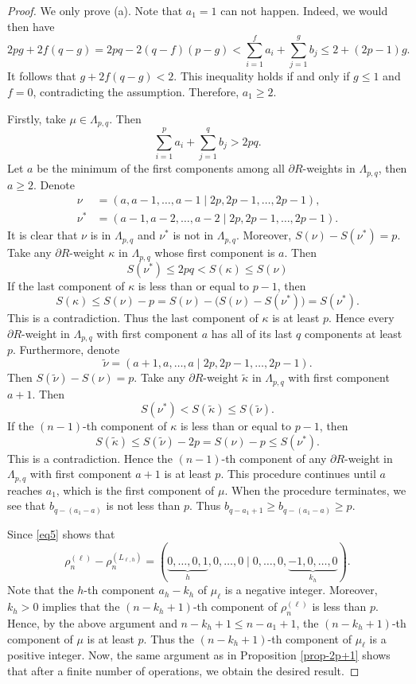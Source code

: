 \documentclass[10pt,a4paper]{amsart}
\begin{document}
\begin{proof}
	We  only prove (a).  Note that $a_1=1$ can not happen. Indeed, we would then have
	\[2pg+2f(q-g)=2pq-2(q-f)(p-g)<\sum_{i=1}^f a_i+\sum_{j=1}^g b_j\le 2+(2p-1)g.\]
  It follows that $g+2f(q-g)<2$. This inequality holds if and only if $g\le 1$ and $f=0$, contradicting the assumption. Therefore, $a_1\ge 2$.


Firstly, take $\mu\in\Lambda_{p, q}$. Then
	\[\sum_{i=1}^pa_i+\sum_{j=1}^qb_j>2pq.\]
	Let $a$ be the minimum of the first components among all $\partial R$-weights in $\Lambda_{p,q}$, then $a\ge 2$. Denote
	\begin{align*}
		\nu&=(a,a-1,\dots,a-1\mid 2p,2p-1,\dots,2p-1), \\
		\nu^*&=(a-1,a-2,\dots,a-2\mid 2p,2p-1,\dots,2p-1).
	\end{align*}
	It is clear that $\nu$ is in $\Lambda_{p,q}$ and $\nu^*$ is not in $\Lambda_{p,q}$. Moreover, $S(\nu)-S(\nu^*)=p$.
Take any $\partial R$-weight $\kappa$ in $\Lambda_{p,q}$ whose first component is $a$. Then
$$
S(\nu^*)\le 2pq< S(\kappa)\leq S(\nu)
$$
If the last component of $\kappa$ is less than or equal to $p-1$, then
$$
S(\kappa)\leq S(\nu)-p=S(\nu)-\big(S(\nu)-S(\nu^*)\big)=S(\nu^*).
$$
This is a contradiction. Thus the last component of $\kappa$ is at least $p$. Hence every $\partial R$-weight in $\Lambda_{p,q}$ with first component $a$ has all of its last $q$ components at least $p$. Furthermore, denote
	\[\widetilde{\nu}=(a+1,a,\dots,a\mid 2p,2p-1,\dots,2p-1).\]
	Then $S(\widetilde{\nu})-S(\nu)=p$.
Take any $\partial R$-weight $\widetilde{\kappa}$ in $\Lambda_{p,q}$ with first component $a+1$. Then
$$
S(\nu^*)<S(\widetilde{\kappa})\leq S(\widetilde{\nu}).
 $$
If the $(n-1)$-th component of $\kappa$ is less than or equal to $p-1$, then
$$
S(\widetilde{\kappa})\leq S(\widetilde{\nu})-2p=S(\nu)-p\leq S(\nu^*).
$$
This is a contradiction. Hence the $(n-1)$-th component of any $\partial R$-weight in $\Lambda_{p,q}$ with first component $a+1$ is at least $p$. This procedure continues until $a$ reaches $a_1$,  which is the first component of $\mu$. When the procedure terminates, we see that $b_{q-(a_1-a)}$ is not less than $p$. Thus $b_{q-a_1+1}\ge b_{q-(a_1-a)}\ge p$.
	
	Since \eqref{eq5} shows that
	\[\rho_n^{(\ell)}-\rho_n^{(L_{\ell, h})}=(\underbrace{0,\dots,0,1}_{h},0,\dots,0\mid 0,\dots,0,\underbrace{-1,0,\dots,0}_{k_{h}}).\]
	Note that the $h$-th component $a_h-k_h$ of $\mu_\ell$ is a negative integer. Moreover, $k_h>0$ implies that the $(n-k_h+1)$-th component of $\rho_n^{(\ell)}$ is less than $p$. Hence, by the above argument and $n-k_h+1\le n-a_1+1$, the $(n-k_h+1)$-th component of $\mu$ is at least $p$. Thus the $(n-k_h+1)$-th component of $\mu_\ell$ is a positive integer. Now, the same argument as in Proposition \ref{prop-2p+1} shows that after a finite number of operations, we obtain the desired result.
	

\end{proof}
\end{document}
